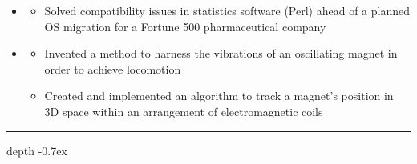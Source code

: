 \documentclass[10pt,letterpaper]{article}
\def\Vhrulefill{\leavevmode\leaders\hrule height 0.7ex depth \dimexpr0.4pt-0.7ex\hfill\kern0pt}
\begin{document}
\begin{itemize}[label={}]

 \item \small{ \hfill {}}
 \vspace{-1.58mm}
 \begin{itemize}[label={}]
 	\item \small{Solved compatibility issues in statistics software (Perl) ahead of a planned OS migration for a Fortune 500 pharmaceutical company}
 \end{itemize}

 \item \small{ \hfill {}}
 \vspace{-1.58mm}
 \begin{itemize}[label={}]
 	\item \small{Invented a method to harness the vibrations of an oscillating magnet in order to achieve locomotion}
 	\item \small{Created and implemented an algorithm to track a magnet's position in 3D space within an arrangement of electromagnetic coils}
 \end{itemize}

\end{itemize}




%
%


\vspace{-.78mm}
\noindent \large{}  \Vhrulefill
\vspace{-.7mm}
\end{document}
